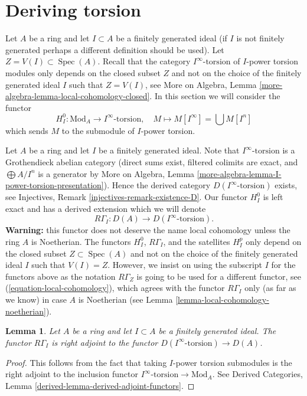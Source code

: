 \documentclass{stacks-project}
\theoremstyle{plain}
\newtheorem{lemma}[subsection]{Lemma}
\theoremstyle{definition}
\theoremstyle{remark}
\numberwithin{equation}{subsection}
\def\Spec{\mathop{\mathrm{Spec}}}
\begin{document}
\section{Deriving torsion}
\label{section-bad-local-cohomology}

\noindent
Let $A$ be a ring and let $I \subset A$ be a finitely generated ideal
(if $I$ is not finitely generated perhaps a different definition
should be used). Let $Z = V(I) \subset \Spec(A)$. Recall that the
category $I^\infty\text{-torsion}$ of $I$-power torsion modules
only depends on the closed subset $Z$ and not on the choice of the
finitely generated ideal $I$ such that $Z = V(I)$, see
More on Algebra, Lemma \ref{more-algebra-lemma-local-cohomology-closed}.
In this section we will consider the functor
$$
H^0_{I} : \text{Mod}_A \longrightarrow I^\infty\text{-torsion},\quad
M \longmapsto M[I^\infty] = \bigcup M[I^n]
$$
which sends $M$ to the submodule of $I$-power torsion.

\medskip\noindent
Let $A$ be a ring and let $I$ be a finitely generated ideal.
Note that $I^\infty\text{-torsion}$ is a Grothendieck
abelian category (direct sums exist, filtered colimits are
exact, and $\bigoplus A/I^n$ is a generator by
More on Algebra, Lemma \ref{more-algebra-lemma-I-power-torsion-presentation}).
Hence the derived category $D(I^\infty\text{-torsion})$ exists, see
Injectives, Remark \ref{injectives-remark-existence-D}.
Our functor $H^0_I$ is left exact and has a derived extension
which we will denote
$$
R\Gamma_I : D(A) \longrightarrow D(I^\infty\text{-torsion}).
$$
{\bf Warning:} this functor does not deserve the name
local cohomology unless the ring $A$ is Noetherian.
The functors $H^0_I$, $R\Gamma_I$, and the satellites $H^p_I$
only depend on the closed subset $Z \subset \Spec(A)$ and not
on the choice of the finitely generated ideal $I$ such that
$V(I) = Z$. However, we insist on using the subscript $I$ for
the functors above as the notation $R\Gamma_Z$ is going
to be used for a different functor, see
(\ref{equation-local-cohomology}), which
agrees with the functor $R\Gamma_I$ only (as far as we know)
in case $A$ is Noetherian
(see Lemma \ref{lemma-local-cohomology-noetherian}).

\begin{lemma}
\label{lemma-adjoint}
Let $A$ be a ring and let $I \subset A$ be a finitely generated ideal.
The functor $R\Gamma_I$ is right adjoint to the functor
$D(I^\infty\text{-torsion}) \to D(A)$.
\end{lemma}

\begin{proof}
This follows from the fact that taking $I$-power torsion submodules
is the right adjoint to the inclusion functor
$I^\infty\text{-torsion} \to \text{Mod}_A$. See
Derived Categories, Lemma \ref{derived-lemma-derived-adjoint-functors}.
\end{proof}
\end{document}

